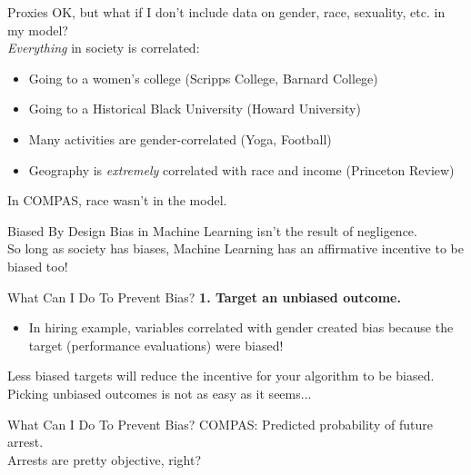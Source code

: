 \documentclass[11pt]{beamer}
\begin{document}
\begin{frame}[c]{Proxies}
  OK, but what if I don't include data on gender, race, sexuality, etc. in my model? \\
  \vspace{0.1cm}
  \emph{Everything} in society is correlated:
  \begin{itemize}
    \pause \item Going to a women's college (Scripps College, Barnard College)
    \pause \item Going to a Historical Black University (Howard University)
    \pause \item Many activities are gender-correlated (Yoga, Football)
    \pause \item Geography is \emph{extremely} correlated with race and income (Princeton Review)
  \end{itemize}
  \pause In COMPAS, \alert{race wasn't in the model}.
\end{frame}

\begin{frame}[c]{Biased By Design}
  Bias in Machine Learning isn't the result of negligence. \\
\vspace{0.3cm}
  \pause \alert{So long as society has biases}, Machine Learning has an \alert{affirmative incentive} to be biased too!
\end{frame}

\begin{frame}[c]{What Can I Do To Prevent Bias?}
\textbf{1. Target an unbiased outcome.}
\begin{itemize}
  \pause \item In hiring example, variables correlated with gender created bias because the target (performance evaluations) were biased!
\end{itemize}
\pause Less biased targets will reduce the incentive for your algorithm to be biased. \\
\pause Picking unbiased outcomes is not as easy as it seems...
\end{frame}

\begin{frame}[c]{What Can I Do To Prevent Bias?}
  COMPAS: Predicted probability of future arrest. \\
  \pause Arrests are pretty objective, right?
\end{frame}
\end{document}
